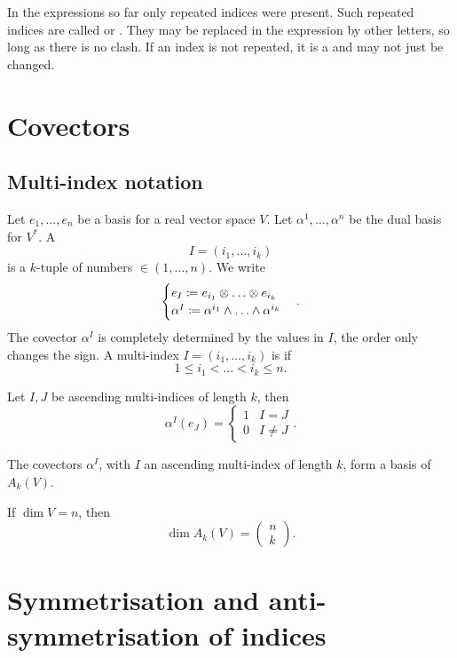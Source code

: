 In the expressions so far only repeated indices were present. Such repeated indices are called   or . They may be replaced in the expression by other letters, so long as there is no clash. If an index is not repeated, it is a  and may not just be changed.

\section{Covectors}

\subsection{Multi-index notation}
Let $e_1,\ldots, e_n$ be a basis for a real vector space $V$. Let $\alpha^1,\ldots, \alpha^n$ be the dual basis for $V^*$. A 
\[ I = (i_1,\ldots,i_k)\]
is a $k$-tuple of numbers $\in (1,\ldots,n)$. We write
\[ \begin{cases}
e_I \coloneqq e_{i_1}\otimes\ldots\otimes e_{i_k}\\
\alpha^I \coloneqq \alpha^{i_1}\wedge\ldots \wedge\alpha^{i_k}
\end{cases}. \]
The covector $\alpha^I$ is completely determined by the values in $I$, the order only changes the sign. A multi-index $I = (i_1,\ldots,i_k)$ is  if
\[ 1\leq i_1<\ldots<i_k\leq n. \]
\begin{proposition}
Let $I,J$ be ascending multi-indices of length $k$, then
\[ \alpha^I(e_J) = \begin{cases}
1 & I=J \\ 0& I\neq J
\end{cases}. \]
\end{proposition}
\begin{proposition}
The covectors $\alpha^I$, with $I$ an ascending multi-index of length $k$, form a basis of $A_k(V)$.
\end{proposition}
\begin{corollary}
If $\dim V=n$, then
\[ \dim A_k(V) = \begin{pmatrix}
n\\k
\end{pmatrix}. \]
\end{corollary}

\section{Symmetrisation and anti-symmetrisation of indices}

